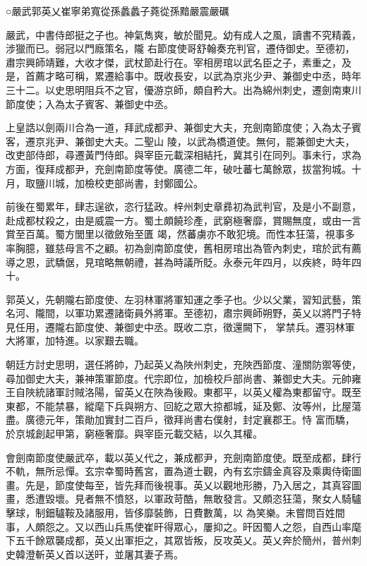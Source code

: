 
\begin{pinyinscope}

 ○嚴武郭英乂崔寧弟寬從孫蠡蠡子蕘從孫黯嚴震嚴礪



 嚴武，中書侍郎挺之子也。神氣雋爽，敏於聞見。幼有成人之風，讀書不究精義，涉獵而已。弱冠以門廕策名，隴
 右節度使哥舒翰奏充判官，遷侍御史。至德初，肅宗興師靖難，大收才傑，武杖節赴行在。宰相房琯以武名臣之子，素重之，及是，首薦才略可稱，累遷給事中。既收長安，以武為京兆少尹、兼御史中丞，時年三十二。以史思明阻兵不之官，優游京師，頗自矜大。出為綿州刺史，遷劍南東川節度使；入為太子賓客、兼御史中丞。



 上皇誥以劍兩川合為一道，拜武成都尹、兼御史大夫，充劍南節度使；入為太子賓客，遷京兆尹、兼御史大夫。二聖山
 陵，以武為橋道使。無何，罷兼御史大夫，改吏部侍郎，尋遷黃門侍郎。與宰臣元載深相結托，冀其引在同列。事未行，求為方面，復拜成都尹，充劍南節度等使。廣德二年，破吐蕃七萬餘眾，拔當狗城。十月，取鹽川城，加檢校吏部尚書，封鄭國公。



 前後在蜀累年，肆志逞欲，恣行猛政。梓州刺史章彞初為武判官，及是小不副意，赴成都杖殺之，由是威震一方。蜀土頗饒珍產，武窮極奢靡，賞賜無度，或由一言賞至百萬。蜀方閭里以徵斂殆至匱
 竭，然蕃虜亦不敢犯境。而性本狂蕩，視事多率胸臆，雖慈母言不之顧。初為劍南節度使，舊相房琯出為管內刺史，琯於武有薦導之恩，武驕倨，見琯略無朝禮，甚為時議所貶。永泰元年四月，以疾終，時年四十。



 郭英乂，先朝隴右節度使、左羽林軍將軍知運之季子也。少以父業，習知武藝，策名河、隴間，以軍功累遷諸衛員外將軍。至德初，肅宗興師朔野，英乂以將門子特見任用，遷隴右節度使、兼御史中丞。既收二京，徵還闕下，
 掌禁兵。遷羽林軍大將軍，加特進。以家艱去職。



 朝廷方討史思明，選任將帥，乃起英乂為陜州刺史，充陜西節度、潼關防禦等使，尋加御史大夫，兼神策軍節度。代宗即位，加檢校戶部尚書、兼御史大夫。元帥雍王自陜統諸軍討賊洛陽，留英乂在陜為後殿。東都平，以英乂權為東都留守。既至東都，不能禁暴，縱麾下兵與朔方、回紇之眾大掠都城，延及鄭、汝等州，比屋蕩盡。廣德元年，策勛加實封二百戶，徵拜尚書右僕射，封定襄郡王。恃
 富而驕，於京城創起甲第，窮極奢靡。與宰臣元載交結，以久其權。



 會劍南節度使嚴武卒，載以英乂代之，兼成都尹，充劍南節度使。既至成都，肆行不軌，無所忌憚。玄宗幸蜀時舊宮，置為道士觀，內有玄宗鑄金真容及乘輿侍衛圖畫。先是，節度使每至，皆先拜而後視事。英乂以觀地形勝，乃入居之，其真容圖畫，悉遭毀壞。見者無不憤怒，以軍政苛酷，無敢發言。又頗恣狂蕩，聚女人騎驢擊球，制鈿驢鞍及諸服用，皆侈靡裝飾，日費數萬，以
 為笑樂。未嘗問百姓間事，人頗怨之。又以西山兵馬使崔旰得眾心，屢抑之。旰因蜀人之怨，自西山率麾下五千餘眾襲成都，英乂出軍拒之，其眾皆叛，反攻英乂。英乂奔於簡州，普州刺史韓澄斬英乂首以送旰，並屠其妻子焉。




\end{pinyinscope}

